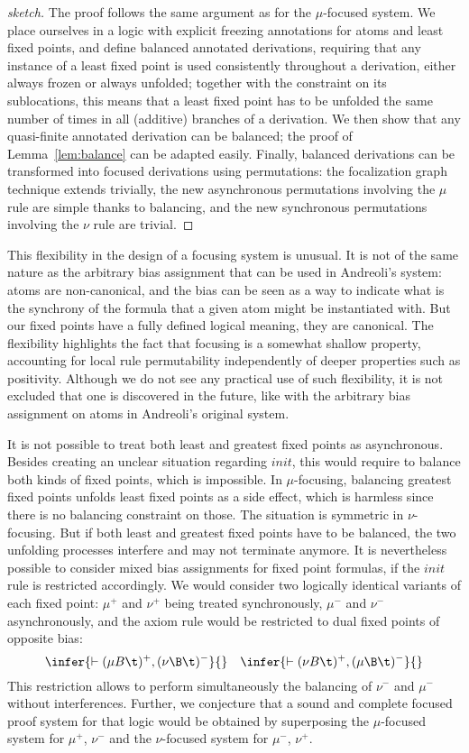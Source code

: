 \begin{proof}[sketch]
The proof follows the same argument as for the $\mu$-focused system.
We place ourselves in a logic with explicit freezing annotations
for atoms and least fixed points,
and define balanced annotated derivations, requiring
that any instance of a least fixed point is used consistently throughout
a derivation, either always frozen or always unfolded;
together with the constraint on its sublocations, this means that
a least fixed point has to be unfolded the same number of times in
all (additive) branches of a derivation.
We then show that any quasi-finite annotated derivation can be balanced;
the proof of Lemma~\ref{lem:balance} can be adapted easily.
Finally, balanced derivations can be transformed into focused
derivations using permutations: the focalization graph technique
extends trivially, the new asynchronous permutations involving the
$\mu$ rule are simple thanks to balancing, and the new synchronous
permutations involving the $\nu$ rule are trivial.
\end{proof}

This flexibility in the design of a focusing system is unusual.
It is not of the same nature as the arbitrary bias assignment that
can be used in Andreoli's system: atoms are non-canonical, and the bias
can be seen as a way to indicate what is the synchrony of the formula
that a given atom might be instantiated with. But our fixed points
have a fully defined logical meaning, they are canonical.
The flexibility highlights the fact that focusing is a somewhat shallow
property, accounting for local rule permutability
independently of deeper properties such as positivity.
Although we do not see any practical use of such flexibility,
it is not excluded that one is discovered in the future,
like with the arbitrary bias assignment on atoms in Andreoli's original 
system.

It is not possible to treat both least and greatest fixed points
as asynchronous. Besides creating an unclear situation regarding $init$,
this would require to balance both kinds of fixed points, which is
impossible. In $\mu$-focusing, balancing greatest fixed points unfolds
least fixed points as a side effect, which is harmless since there is
no balancing constraint on those. The situation is symmetric in
$\nu$-focusing. But if both least and greatest fixed points
have to be balanced, the two unfolding processes interfere
and may not terminate anymore.
It is nevertheless possible to consider mixed bias assignments
for fixed point formulas, if the $init$ rule is restricted accordingly.
We would consider two logically identical variants
of each fixed point: $\mu^+$ and $\nu^+$ being treated synchronously,
$\mu^-$ and $\nu^-$ asynchronously, and the axiom rule would be
restricted to dual fixed points of opposite bias:
\[ \infer{\vdash (\mu B\t)^+, (\nu \B \t)^-}{} \quad
   \infer{\vdash (\nu B\t)^+, (\mu \B \t)^-}{} \]
This restriction allows to perform simultaneously the balancing of
$\nu^-$ and $\mu^-$ without interferences. Further, we conjecture
that a sound and complete focused proof system for that logic would be
obtained by superposing
the $\mu$-focused system for $\mu^+$, $\nu^-$ and the $\nu$-focused
system for $\mu^-$, $\nu^+$.

